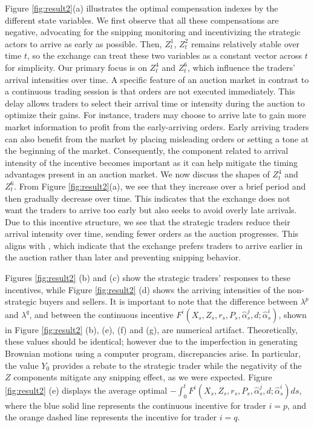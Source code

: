 \documentclass[12pt]{article}
\begin{document}
Figure \ref{fig:result2}(a) illustrates the optimal compensation indexes by the different state variables. We first observe that all these compensations are negative, advocating for the snipping monitoring and incentivizing the strategic actors to arrive as early as possible. Then, $Z^1_t$, $Z^2_t$ remains relatively stable over time $t$, so the exchange can treat these two variables as a constant vector across $t$ for simplicity. Our primary focus is on $Z^4_t$ and $Z^6_t$, which influence the traders' arrival intensities over time. A specific feature of an auction market in contrast to a continuous trading session is that orders are not executed immediately. This delay allows traders to select their arrival time or intensity during the auction to optimize their gains. For instance, traders may choose to arrive late to gain more market information to profit from the early-arriving orders. Early arriving traders can also benefit from the market by placing misleading orders or setting a tone at the beginning of the market. Consequently, the component related to arrival intensity of the incentive becomes important as it can help mitigate the timing advantages present in an auction market. We now discuss the shapes of $Z^4_t$ and $Z^6_t$. From Figure \ref{fig:result2}(a), we see that they increase over a brief period and then gradually decrease over time. This indicates that the exchange does not want the traders to arrive too early but also seeks to avoid overly late arrivals. Due to this incentive structure, we see that the strategic traders reduce their arrival intensity over time, sending fewer orders as the auction progresses. This aligns with \cite{mastrolia2024clearing}, which indicate that the exchange prefers traders to arrive earlier in the auction rather than later and preventing snipping behavior. \vspace{0.5em}

Figures \ref{fig:result2} (b) and (c) show the strategic traders' responses to these incentives, while Figure \ref{fig:result2} (d) shows the arriving intensities of the non-strategic buyers and sellers. It is important to note that the difference between $\lambda^p$ and $\lambda^q$, and between the continuous incentive $F^i(X_s,Z_s,r_s,P_s, \hat \alpha^j_s,d;\hat \alpha^i_s)$, shown in Figure \ref{fig:result2} (b), (e), (f) and (g), are numerical artifact. Theoretically, these values should be identical; however due to the imperfection in generating Brownian motions using a computer program, discrepancies arise. In particular, the value $Y_0$ provides a rebate to the strategic trader while the negativity of the $Z$ components mitigate any snipping effect, as we were expected. \vspace{0.5em}
Figure \ref{fig:result2} (e) displays the average optimal $-\int_0^t F^i(X_s,Z_s,r_s,P_s, \hat \alpha^j_s,d;\hat \alpha^i_s) ds$, where the blue solid line represents the continuous incentive for trader $i=p$, and the orange dashed line represents the incentive for trader $i=q$.\vspace{0.5em}
\end{document}
